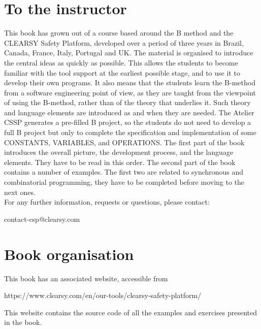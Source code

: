 \section{To the instructor}
This book has grown out of a course based around the B method and the CLEARSY Safety Platform, developed over a period of three years in Brazil, Canada, France, Italy, Portugal and UK.
The material is organised to introduce the central ideas as quickly as possible. This allows the students to become familiar with the tool support at the earliest possible stage, and to use it to develop their own programs. It also means that the students learn the B-method from a software engineering point of view, as they are taught from the viewpoint of using the B-method, rather than of the theory that underlies it. Such theory and language elements are introduced as and when they are needed. The Atelier CSSP generates a pre-filled B project, so the students do not need to develop a full B project but only to complete the specification and implementation of some CONSTANTS, VARIABLES, and OPERATIONS.
The first part of the book introduces the overall picture, the development process, and the language elements. They have to be read in this order.
The second part of the book contains a number of examples. The first two are related to synchronous and combinatorial programming, they have to be completed before moving to the next ones. \\

\noindent For any further information, requests or questions, please contact:
\begin{center}
contact-csp@clearsy.com    
\end{center}


\section{Book organisation}

This book has an associated website, accessible from
\begin{center}
https://www.clearsy.com/en/our-tools/clearsy-safety-platform/    
\end{center}

\noindent This website contains the source code of all the examples and exercises presented in the book.

